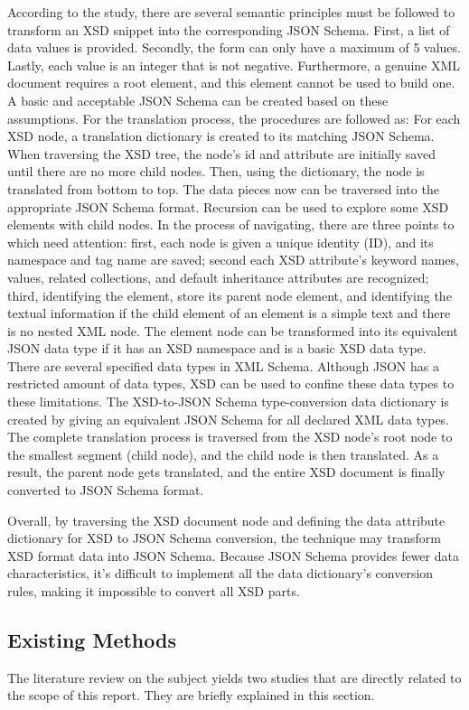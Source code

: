 According to the study, there are several semantic principles must be followed
to transform an XSD snippet into the corresponding JSON Schema. First, a list of
data values is provided. Secondly, the form can only have a maximum of 5 values.
Lastly, each value is an integer that is not negative. Furthermore, a genuine
XML document requires a root element, and this element cannot be used to build
one. A basic and acceptable JSON Schema can be created based on these
assumptions. For the translation process, the procedures are followed as: For
each XSD node, a translation dictionary is created to its matching JSON Schema.
When traversing the XSD tree, the node's id and attribute are initially saved
until there are no more child nodes. Then, using the dictionary, the node is
translated from bottom to top. The data pieces now can be traversed into the
appropriate JSON Schema format. Recursion can be used to explore some XSD
elements with child nodes. In the process of navigating, there are three points
to which need attention: first, each node is given a unique identity (ID), and
its namespace and tag name are saved; second each XSD attribute's keyword names,
values, related collections, and default inheritance attributes are recognized;
third, identifying the element, store its parent node element, and identifying
the textual information if the child element of an element is a simple text and
there is no nested XML node. The element node can be transformed into its
equivalent JSON data type if it has an XSD namespace and is a basic XSD data
type. There are several specified data types in XML Schema. Although JSON has a
restricted amount of data types, XSD can be used to confine these data types to
these limitations. The XSD-to-JSON Schema type-conversion data dictionary is
created by giving an equivalent JSON Schema for all declared XML data types. The
complete translation process is traversed from the XSD node's root node to the
smallest segment (child node), and the child node is then translated. As a
result, the parent node gets translated, and the entire XSD document is finally
converted to JSON Schema format.

Overall, by traversing the XSD document node and defining the data attribute
dictionary for XSD to JSON Schema conversion, the technique may transform XSD
format data into JSON Schema. Because JSON Schema provides fewer data
characteristics, it's difficult to implement all the data dictionary's
conversion rules, making it impossible to convert all XSD parts.

\subsection{Existing Methods}
The literature review on the subject yields two studies that are directly
related to the scope of this report. They are briefly explained in this section.

